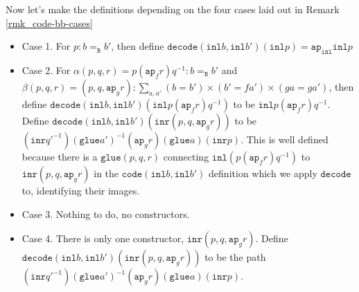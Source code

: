 \documentclass[12pt]{amsart}
\newcommand{\type}[1]{\mathtt{#1}}
\newcommand{\A}{\type{A}}
\newcommand{\B}{\type{B}}
\newcommand{\ap}{\type{ap}}
\newcommand{\inl}{\type{inl}}
\newcommand{\inr}{\type{inr}}
\newcommand{\glue}{\type{glue}}
\newcommand{\code}{\type{code}}
\newcommand{\decode}{\type{decode}}
\theoremstyle{remark}
\theoremstyle{definition}
\begin{document}
Now let's make the definitions depending on the four cases laid out in
Remark \ref{rmk_code-bb-cases}
\begin{itemize}
	\item Case 1. For $ p : b =_{\B} b' $, then define $ \decode (
\inl b , \inl b' ) (\inl p) = \ap_{\inl} \inl p$
	\item Case 2.  For $ \alpha (p,q,r) = p (\ap_f r) q^{-1} : b
=_{\B} b' $ and $ \beta (p,q,r) = (p,q,\ap_g r) : \sum_{a,a'} (b=b')
\times (b'=fa') \times (ga=ga') $, then define $ \decode (\inl b ,
\inl b') ( \inl p (\ap_f r) q^{-1}) $ to be $ \inl p (\ap_f r) q^{-1}
$.  Define $ \decode (\inl b , \inl b') ( \inr (p,q,\ap_g r) ) $ to be
$ (\inr q'^{-1})(\glue a')^{-1}(\ap_{g}r)(\glue a)(\inr p) $. This is
well defined because there is a $ \glue (p,q,r) $ connecting $ \inl (p
(\ap_f r) q^{-1}) $ to $ \inr (p,q,\ap_g r) $ in the $ \code (\inl b ,
\inl b') $ definition which we apply $ \decode $ to, identifying their
images.
	\item Case 3. Nothing to do, no constructors.
	\item Case 4. There is only one constructor, $ \inr (p,q,
\ap_g r) $.  Define $ \decode ( \inl b , \inl b') ( \inr (p,q, \ap_g
r) ) $ to be the path $ (\inr q'^{-1})(\glue a')^{-1}(\ap_{g}r)(\glue
a)(\inr p) $.
\end{itemize}

\end{document}

